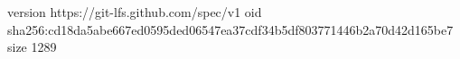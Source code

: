 version https://git-lfs.github.com/spec/v1
oid sha256:cd18da5abe667ed0595ded06547ea37cdf34b5df803771446b2a70d42d165be7
size 1289
